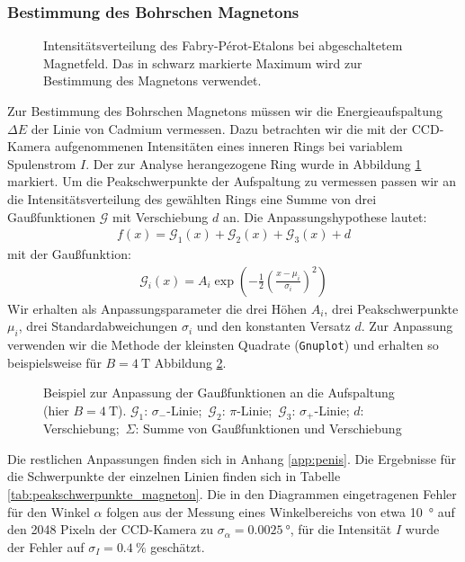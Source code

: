 \documentclass[11pt, a4paper]{article}
\begin{document}
\FloatBarrier
\subsubsection{Bestimmung des Bohrschen Magnetons}
\label{sssec:magneton}
\begin{figure}[h]
	\centering
	
	\caption{Intensitätsverteilung des Fabry-Pérot-Etalons bei abgeschaltetem Magnetfeld. Das in schwarz markierte Maximum wird zur Bestimmung des Magnetons verwendet.}
	\label{fig:peakauswahl}
\end{figure}
Zur Bestimmung des Bohrschen Magnetons müssen wir die Energieaufspaltung $\Delta E$ der Linie von Cadmium vermessen.
Dazu betrachten wir die mit der CCD-Kamera aufgenommenen Intensitäten eines inneren Rings bei variablem Spulenstrom $I$.
Der zur Analyse herangezogene Ring wurde in Abbildung \ref{fig:peakauswahl} markiert.
Um die Peakschwerpunkte der Aufspaltung zu vermessen passen wir an die Intensitätsverteilung des gewählten Rings eine Summe von drei Gaußfunktionen $\mathcal{G}$ mit Verschiebung $d$ an.
Die Anpassungshypothese lautet:
\begin{align}
f(x) = \mathcal{G}_1(x) + \mathcal{G}_2(x) + \mathcal{G}_3(x) + d
\end{align}
mit der Gaußfunktion:
\begin{align}
\mathcal{G}_i(x) = A_i \exp\left( -\frac{1}{2} \left( \frac{x - \mu_i}{\sigma_i} \right)^2 \right)
\end{align}
Wir erhalten als Anpassungsparameter die drei Höhen $A_i$, drei Peakschwerpunkte $\mu_i$, drei Standardabweichungen $\sigma_i$ und den konstanten Versatz $d$.
Zur Anpassung verwenden wir die Methode der kleinsten Quadrate (\texttt{Gnuplot}) und erhalten so beispielsweise für $B = \SI{4}{\tesla}$ Abbildung \ref{fig:zeeman_b4_bsp}.
\begin{figure}[h]
	\centering
	
	\caption{Beispiel zur Anpassung der Gaußfunktionen an die Aufspaltung (hier $B = \SI{4}{\tesla}$). $\mathcal{G}_1$: $\sigma_-$-Linie;\, $\mathcal{G}_2$: $\pi$-Linie;\, $\mathcal{G}_3$: $\sigma_+$-Linie; $d$: Verschiebung;\, $\Sigma$: Summe von Gaußfunktionen und Verschiebung}
	\label{fig:zeeman_b4_bsp}
\end{figure}
Die restlichen Anpassungen finden sich in Anhang \ref{app:penis}.
Die Ergebnisse für die Schwerpunkte der einzelnen Linien finden sich in Tabelle \ref{tab:peakschwerpunkte_magneton}.
Die in den Diagrammen eingetragenen Fehler für den Winkel $\alpha$ folgen aus der Messung eines Winkelbereichs von etwa \SI{10}{\degree} auf den \num{2048} Pixeln der CCD-Kamera zu $\sigma_\alpha = \SI{0.0025}{\degree}$, für die Intensität $I$ wurde der Fehler auf $\sigma_I = \SI{0.4}{\percent}$ geschätzt.
\end{document}
